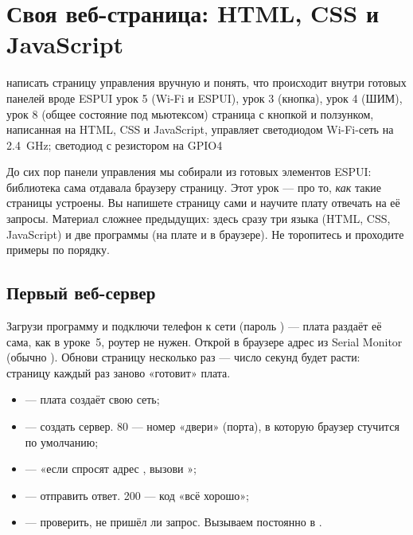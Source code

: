 \section{Своя веб-страница: HTML, CSS и JavaScript}\label{les:web}
\lessonintro
  {написать страницу управления вручную и понять, что происходит внутри готовых панелей вроде ESPUI}
  {урок 5 (Wi-Fi и ESPUI), урок 3 (кнопка), урок 4 (ШИМ), урок 8 (общее состояние под мьютексом)}
  {страница с кнопкой и ползунком, написанная на HTML, CSS и JavaScript, управляет светодиодом}
  {Wi-Fi-сеть на \SI{2.4}{GHz}; светодиод с резистором на GPIO4}

До сих пор панели управления мы собирали из готовых элементов ESPUI: библиотека сама отдавала
браузеру страницу. Этот урок --- про то, \emph{как} такие страницы устроены. Вы напишете страницу
сами и научите плату отвечать на её запросы. Материал сложнее предыдущих: здесь сразу три языка
(HTML, CSS, JavaScript) и две программы (на плате и в браузере). Не торопитесь и проходите примеры по порядку.

\subsection{Первый веб-сервер}


Загрузи программу и подключи телефон к сети  (пароль ) --- плата
раздаёт её сама, как в уроке~5, роутер не нужен. Открой в браузере адрес из Serial Monitor
(обычно ). Обнови страницу несколько раз --- число секунд будет расти:
страницу каждый раз заново «готовит» плата.

\begin{itemize}
  \item {} --- плата создаёт свою сеть;
  \item {} --- создать сервер. 80 --- номер «двери» (порта), в которую браузер
        стучится по умолчанию;
  \item {} --- «если спросят адрес \code{/}, вызови »;
  \item {} --- отправить ответ. 200 --- код «всё хорошо»;
  \item {} --- проверить, не пришёл ли запрос. Вызываем постоянно в .
\end{itemize}


